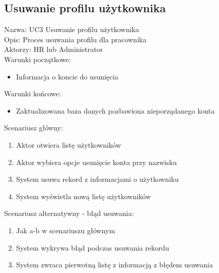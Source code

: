 \subsection{Usuwanie profilu użytkownika}
Nazwa: UC3 Usuwanie profilu użytkownika \\
Opis: Proces usuwania profilu dla pracownika \\
Aktorzy: HR lub Administrator \\
Warunki początkowe:
\begin{itemize}
\item Informacja o koncie do usunięcia
\end{itemize}
Warunki końcowe: 
\begin{itemize}
\item Zaktualizowana baza danych pozbawiona nieporządanego konta
\end{itemize}
Scenariusz główny:
\begin{enumerate}
\item Aktor otwiera listę użytkowników
\item Aktor wybiera opcje usunięcie konta przy nazwisku
\item System usuwa rekord z informacjami o użytkowniku
\item System wyświetla nową listę użytkowników
\end{enumerate}
Scenariusz alternatywny - błąd usuwania: 
\begin{enumerate}
\item Jak a-b w scenariuszu głównym
\item System wykrywa błąd podczas usuwania rekordu
\item System zwraca pierwotną listę z informacją z błędem usuwania
\end{enumerate}


